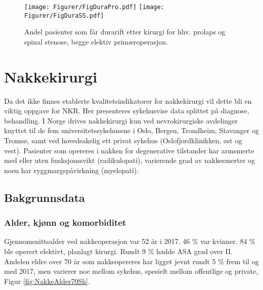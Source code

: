\documentclass [norsk,a4paper,twoside]{article}\usepackage[]{graphicx}\usepackage[]{color}
\makeatletter
\newenvironment{kframe}{%
 \def\at@end@of@kframe{}%
 \ifinner\ifhmode%
  \def\at@end@of@kframe{\end{minipage}}%
  \begin{minipage}{\columnwidth}%
 \fi\fi%
 \def\FrameCommand##1{\hskip\@totalleftmargin \hskip-\fboxsep
 \colorbox{shadecolor}{##1}\hskip-\fboxsep
     \hskip-\linewidth \hskip-\@totalleftmargin \hskip\columnwidth}%
 \MakeFramed {\advance\hsize-\width
   \@totalleftmargin\z@ \linewidth\hsize
   \@setminipage}}%
 {\par\unskip\endMakeFramed%
 \at@end@of@kframe}
\newenvironment{knitrout}{}{} %
\makeatother
\begin{document}
\begin{figure}[ht]
\centering \texttt{[image: Figurer/FigDuraPro.pdf]}
\centering \texttt{[image: Figurer/FigDuraSS.pdf]}
\caption{\label{fig:Dura} Andel pasienter som får durarift etter kirurgi for hhv. prolaps og spinal stenose, begge elektiv primæroperasjon.}
\end{figure}









\clearpage

\section{Nakkekirurgi}
Da  det ikke finnes etablerte kvalitetsindikatorer for nakkekirurgi vil dette bli en
viktig oppgave for NKR.  Her presenteres sykehusvise data splittet på diagnose, behandling.
I Norge drives nakkekirurgi kun ved nevrokirurgiske avdelinger knyttet til de fem
universitetssykehusene i Oslo, Bergen, Trondheim, Stavanger og Tromsø, samt ved
hovedsakelig ett privat sykehus (Oslofjordklinikken, øst og vest).
Pasienter som opereres i nakken for degenerative tilstander har armsmerte med eller uten funksjonssvikt (radikulopati), varierende grad av nakkesmerter og noen har ryggmargspåvirkning (myelopati). 

\begin{knitrout}
\color{fgcolor}\begin{kframe}


{\ttfamily\noindent\itshape\color{messagecolor}{\#\# \\\#\# Attaching package: 'Nakke'}}

{\ttfamily\noindent\itshape\color{messagecolor}{\#\# The following object is masked \_by\_ '.GlobalEnv':\\\#\# \\\#\#\ \ \ \  RegData}}\end{kframe}
\end{knitrout}

\subsection{Bakgrunnsdata}



\subsubsection{Alder, kjønn og komorbiditet}
Gjennomsnittsalder ved nakkeoperasjon var 52 år i 2017. 46 \% var kvinner. 84 \% ble operert elektivt, planlagt kirurgi. Rundt  9 \% hadde ASA grad over II. Andelen eldre over 70 år som nakkeopereres har ligget jevnt rundt 5 \% frem til og med 2017, men varierer noe mellom sykehus, spesielt mellom offentlige og private, Figur \ref{fig:NakkeAlder70Sh}.
\end{document}

